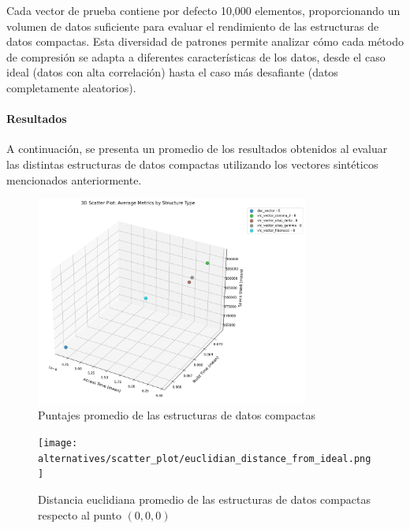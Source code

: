 Cada vector de prueba contiene por defecto 10,000 elementos, proporcionando un volumen de datos suficiente para evaluar el rendimiento de las estructuras de datos compactas. Esta diversidad de patrones permite analizar cómo cada método de compresión se adapta a diferentes características de los datos, desde el caso ideal (datos con alta correlación) hasta el caso más desafiante (datos completamente aleatorios).

\paragraph{Resultados}
\vspace{0.2cm}

A continuación, se presenta un promedio de los resultados obtenidos al evaluar las distintas estructuras de datos compactas utilizando los vectores sintéticos mencionados anteriormente.

\begin{figure}[H]
\centering
\includegraphics[width=0.8\textwidth]{alternatives/scatter_plot/3d_scatter_plot_structures.png}
\caption{Puntajes promedio de las estructuras de datos compactas}   
\label{fig:scatter_plot_structures}
\end{figure}

\begin{figure}[H]
\centering
\texttt{[image: alternatives/scatter\_plot/euclidian\_distance\_from\_ideal.png]}
\caption{Distancia euclidiana promedio de las estructuras de datos compactas respecto al punto $(0, 0, 0)$}   
\label{fig:euclidian_distance_from_ideal}
\end{figure}



